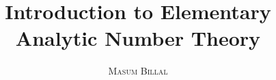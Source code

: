 \documentclass[12pt,leqno]{book}
\title{\bfseries Introduction to Elementary Analytic Number Theory}
\author{\scshape Masum Billal}
\theoremstyle{definition}
\begin{document}
    \frontmatter
    
    \maketitle
    \tableofcontents
    
    \printnomenclature
    \mainmatter
    \begin{refsection}
    \end{refsection}

	\begin{refsection}
		
        
    \end{refsection}

	\begin{refsection}
		
	\end{refsection}

	\begin{refsection}
		
	\end{refsection}
    \backmatter
    \printglossary[type=\acronymtype,title={List of Acronyms}]
    \printglossary[title=Glossary,type=main]
    \printindex
\end{document}
